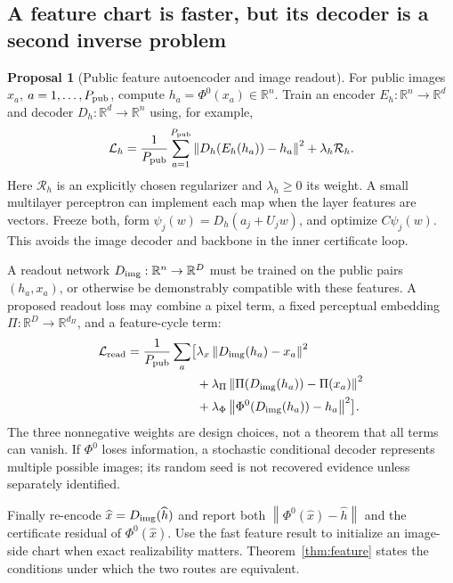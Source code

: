 \documentclass[11pt,a4paper]{article}
\theoremstyle{definition}
\theoremstyle{definition}
\newtheorem{proposal}[theorem]{Proposal}
\theoremstyle{remark}\newtheorem{remark}[theorem]{Remark}
\newcommand{\R}{\mathbb R}\newcommand{\Prob}{\mathbb P}\newcommand{\E}{\mathbb E}
\newcommand{\norm}[1]{\left\lVert #1\right\rVert}
\begin{document}
\subsection{A feature chart is faster, but its decoder is a second inverse problem}

\begin{proposal}[Public feature autoencoder and image readout]\label{pr:featurebuild}
For public images $x_a$, $a=1,\ldots,P_{\rm pub}$, compute $h_a=\Phi^0(x_a)\in\R^n$. Train an encoder $E_h:\R^n\to\R^d$ and decoder $D_h:\R^d\to\R^n$ using, for example,
\[
\mathcal L_h=\frac1{P_{\rm pub}}\sum_{a=1}^{P_{\rm pub}}
\norm{D_h(E_h(h_a))-h_a}^2+\lambda_h\mathcal R_h.
\]
Here $\mathcal R_h$ is an explicitly chosen regularizer and $\lambda_h\ge0$ its weight. A small multilayer perceptron can implement each map when the layer features are vectors. Freeze both, form $\psi_j(w)=D_h(a_j+U_jw)$, and optimize $C\psi_j(w)$. This avoids the image decoder and backbone in the inner certificate loop.

A readout network $D_{\rm img}:\R^n\to\R^D$ must be trained on the public pairs $(h_a,x_a)$, or otherwise be demonstrably compatible with these features. A proposed readout loss may combine a pixel term, a fixed perceptual embedding $\Pi:\R^D\to\R^{d_\Pi}$, and a feature-cycle term:
\[
\begin{aligned}
\mathcal L_{\rm read}=\frac1{P_{\rm pub}}\sum_a
\bigl[&\lambda_x\norm{D_{\rm img}(h_a)-x_a}^2\\
&+\lambda_\Pi\norm{\Pi(D_{\rm img}(h_a))-\Pi(x_a)}^2\\
&+\lambda_\Phi\norm{\Phi^0(D_{\rm img}(h_a))-h_a}^2\bigr].
\end{aligned}
\]
The three nonnegative weights are design choices, not a theorem that all terms can vanish. If $\Phi^0$ loses information, a stochastic conditional decoder represents multiple possible images; its random seed is not recovered evidence unless separately identified.

Finally re-encode $\widehat x=D_{\rm img}(\widehat h)$ and report both $\norm{\Phi^0(\widehat x)-\widehat h}$ and the certificate residual of $\Phi^0(\widehat x)$. Use the fast feature result to initialize an image-side chart when exact realizability matters. Theorem~\ref{thm:feature} states the conditions under which the two routes are equivalent.
\end{proposal}
\end{document}
